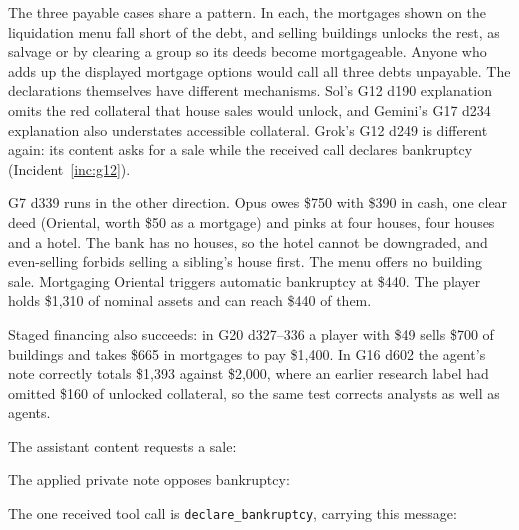 The three payable cases share a pattern. In each, the mortgages shown on the liquidation menu fall short of the debt, and selling buildings unlocks the rest, as salvage or by clearing a group so its deeds become mortgageable. Anyone who adds up the displayed mortgage options would call all three debts unpayable. The declarations themselves have different mechanisms. Sol's G12 d190 explanation omits the red collateral that house sales would unlock, and Gemini's G17 d234 explanation also understates accessible collateral. Grok's G12 d249 is different again: its content asks for a sale while the received call declares bankruptcy (Incident~\ref{inc:g12}).

G7 d339 runs in the other direction. Opus owes \$750 with \$390 in cash, one clear deed (Oriental, worth \$50 as a mortgage) and pinks at four houses, four houses and a hotel. The bank has no houses, so the hotel cannot be downgraded, and even-selling forbids selling a sibling's house first. The menu offers no building sale. Mortgaging Oriental triggers automatic bankruptcy at \$440. The player holds \$1,310 of nominal assets and can reach \$440 of them.

Staged financing also succeeds: in G20 d327--336 a player with \$49 sells \$700 of buildings and takes \$665 in mortgages to pay \$1,400. In G16 d602 the agent's note correctly totals \$1,393 against \$2,000, where an earlier research label had omitted \$160 of unlocked collateral, so the same test corrects analysts as well as agents.


The assistant content requests a sale:


The applied private note opposes bankruptcy:


The one received tool call is \texttt{declare\_bankruptcy}, carrying this message:



